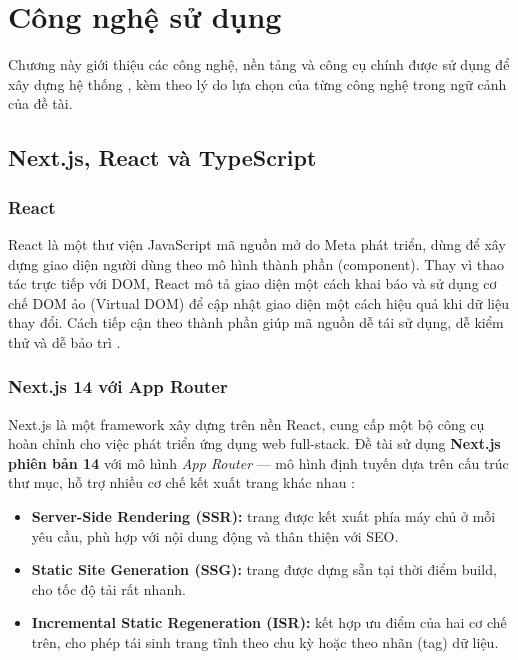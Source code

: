 \chapter{Công nghệ sử dụng}
\label{ch:tech}

Chương này giới thiệu các công nghệ, nền tảng và công cụ chính được sử dụng để xây dựng hệ
thống \brandName{}, kèm theo lý do lựa chọn của từng công nghệ trong ngữ cảnh của đề tài.

\section{Next.js, React và TypeScript}

\subsection{React}

React là một thư viện JavaScript mã nguồn mở do Meta phát triển, dùng để xây dựng giao diện
người dùng theo mô hình thành phần (component). Thay vì thao tác trực tiếp với DOM, React mô
tả giao diện một cách khai báo và sử dụng cơ chế DOM ảo (Virtual DOM) để cập nhật giao diện
một cách hiệu quả khi dữ liệu thay đổi. Cách tiếp cận theo thành phần giúp mã nguồn dễ tái sử
dụng, dễ kiểm thử và dễ bảo trì \cite{react,reactjs2018}.

\subsection{Next.js 14 với App Router}

Next.js là một framework xây dựng trên nền React, cung cấp một bộ công cụ hoàn chỉnh cho việc
phát triển ứng dụng web full-stack. Đề tài sử dụng \textbf{Next.js phiên bản 14} với mô hình
\textit{App Router} --- mô hình định tuyến dựa trên cấu trúc thư mục, hỗ trợ nhiều cơ chế kết
xuất trang khác nhau \cite{nextjs}:

\begin{itemize}
  \item \textbf{Server-Side Rendering (SSR):} trang được kết xuất phía máy chủ ở mỗi yêu cầu,
  phù hợp với nội dung động và thân thiện với SEO.
  \item \textbf{Static Site Generation (SSG):} trang được dựng sẵn tại thời điểm build, cho tốc độ
  tải rất nhanh.
  \item \textbf{Incremental Static Regeneration (ISR):} kết hợp ưu điểm của hai cơ chế trên, cho
  phép tái sinh trang tĩnh theo chu kỳ hoặc theo nhãn (tag) dữ liệu.
\end{itemize}

